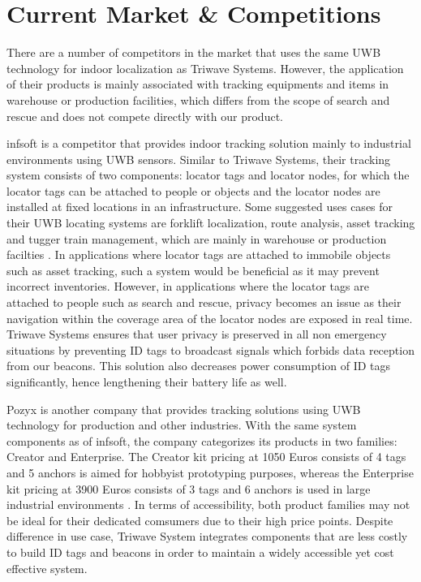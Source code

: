 

\setcounter{section}{2}
\section{Current Market \& Competitions}
\bigskip

There are a number of competitors in the market that uses the same UWB technology for indoor localization as Triwave Systems. However, the application of their products is mainly associated with tracking equipments and items in warehouse or production facilities, which differs from the scope of search and rescue and does not compete directly with our product. 

\bigskip
infsoft is a competitor that provides indoor tracking solution mainly to industrial environments using UWB sensors. Similar to Triwave Systems, their tracking system consists of two components: locator tags and locator nodes, for which the locator tags can be attached to people or objects and the locator nodes are installed at fixed locations in an infrastructure. Some suggested uses cases for their UWB locating systems are forklift localization, route analysis, asset tracking and tugger train management, which are mainly in warehouse or production facilties \cite{R3-1}. In applications where locator tags are attached to immobile objects such as asset tracking, such a system would be beneficial as it may prevent incorrect inventories. However, in applications where the locator tags are attached to people such as search and rescue, privacy becomes an issue as their navigation within the coverage area of the locator nodes are exposed in real time. Triwave Systems ensures that user privacy is preserved in all non emergency situations by preventing ID tags to broadcast signals which forbids data reception from our beacons. This solution also decreases power consumption of ID tags significantly, hence lengthening their battery life as well. 

\bigskip
Pozyx is another company that provides tracking solutions using UWB technology for production and other industries. With the same system components as of infsoft, the company categorizes its products in two families: Creator and Enterprise. The Creator kit pricing at 1050 Euros consists of 4 tags and 5 anchors is aimed for hobbyist prototyping purposes, whereas the Enterprise kit pricing at 3900 Euros consists of 3 tags and 6 anchors is used in large industrial environments \cite{R3-2}. In terms of accessibility, both product families may not be ideal for their dedicated comsumers due to their high price points. Despite difference in use case, Triwave System integrates components that are less costly to build ID tags and beacons in order to maintain a widely accessible yet cost effective system. 

